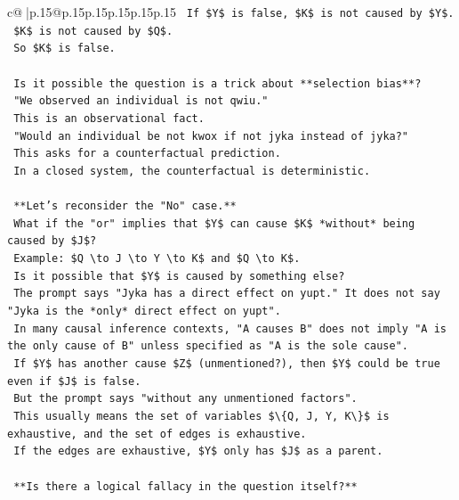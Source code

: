 \documentclass{article}
\begin{document}
{\begin{supertabular}{c@{$\;$}|p{.15\linewidth}@{}p{.15\linewidth}p{.15\linewidth}p{.15\linewidth}p{.15\linewidth}p{.15\linewidth}}
{{{\texttt{        If \$Y\$ is false, \$K\$ is not caused by \$Y\$.} \\
\texttt{        \$K\$ is not caused by \$Q\$.} \\
\texttt{        So \$K\$ is false.} \\
\\ 
\texttt{        Is it possible the question is a trick about **selection bias**?} \\
\texttt{        "We observed an individual is not qwiu."} \\
\texttt{        This is an observational fact.} \\
\texttt{        "Would an individual be not kwox if not jyka instead of jyka?"} \\
\texttt{        This asks for a counterfactual prediction.} \\
\texttt{        In a closed system, the counterfactual is deterministic.} \\
\\ 
\texttt{        **Let's reconsider the "No" case.**} \\
\texttt{        What if the "or" implies that \$Y\$ can cause \$K\$ *without* being caused by \$J\$?} \\
\texttt{        Example: \$Q \textbackslash{}to J \textbackslash{}to Y \textbackslash{}to K\$ and \$Q \textbackslash{}to K\$.} \\
\texttt{        Is it possible that \$Y\$ is caused by something else?} \\
\texttt{        The prompt says "Jyka has a direct effect on yupt." It does not say "Jyka is the *only* direct effect on yupt".} \\
\texttt{        In many causal inference contexts, "A causes B" does not imply "A is the only cause of B" unless specified as "A is the sole cause".} \\
\texttt{        If \$Y\$ has another cause \$Z\$ (unmentioned?), then \$Y\$ could be true even if \$J\$ is false.} \\
\texttt{        But the prompt says "without any unmentioned factors".} \\
\texttt{        This usually means the set of variables \$\textbackslash{}\{Q, J, Y, K\textbackslash{}\}\$ is exhaustive, and the set of edges is exhaustive.} \\
\texttt{        If the edges are exhaustive, \$Y\$ only has \$J\$ as a parent.} \\
\\ 
\texttt{        **Is there a logical fallacy in the question itself?**} \\
}}}
\end{supertabular}}
\end{document}
